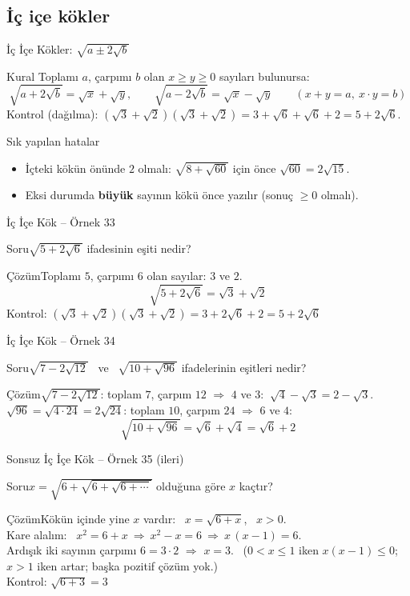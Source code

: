 \documentclass[aspectratio=169,11pt,handout]{beamer}
\newcommand{\soru}[3]{%
\begin{frame}{#1}
  \begin{block}{Soru}\large #2\end{block}
  \pause
  \begin{exampleblock}{Çözüm}\large #3\end{exampleblock}
\end{frame}}
\begin{document}
\subsection{İç içe kökler}
\begin{frame}{İç İçe Kökler: \(\sqrt{a\pm 2\sqrt b}\)}
\begin{block}{Kural}
Toplamı \(a\), çarpımı \(b\) olan \(x\ge y\ge 0\) sayıları bulunursa:
\[\sqrt{a+2\sqrt b}=\sqrt x+\sqrt y,\qquad \sqrt{a-2\sqrt b}=\sqrt x-\sqrt y\qquad(x+y=a,\ x\cdot y=b)\]
Kontrol (dağılma): \((\sqrt3+\sqrt2)(\sqrt3+\sqrt2)=3+\sqrt6+\sqrt6+2=5+2\sqrt6\).
\end{block}
\begin{alertblock}{Sık yapılan hatalar}
\begin{itemize}
\item İçteki kökün önünde \textbf{\(2\)} olmalı: \(\sqrt{8+\sqrt{60}}\) için önce \(\sqrt{60}=2\sqrt{15}\).
\item Eksi durumda \textbf{büyük} sayının kökü önce yazılır (sonuç \(\ge 0\) olmalı).
\end{itemize}
\end{alertblock}
\end{frame}

\soru{İç İçe Kök -- Örnek 33}
{\(\sqrt{5+2\sqrt6}\) ifadesinin eşiti nedir?}
{Toplamı \(5\), çarpımı \(6\) olan sayılar: \(3\) ve \(2\).
\[\sqrt{5+2\sqrt6}=\sqrt3+\sqrt2\]
Kontrol: \((\sqrt3+\sqrt2)(\sqrt3+\sqrt2)=3+2\sqrt6+2=5+2\sqrt6\) \checkmark}

\soru{İç İçe Kök -- Örnek 34}
{\(\sqrt{7-2\sqrt{12}}\) \ ve \ \(\sqrt{10+\sqrt{96}}\) ifadelerinin eşitleri nedir?}
{\(\sqrt{7-2\sqrt{12}}\): toplam \(7\), çarpım \(12\) \(\Rightarrow\) \(4\) ve \(3\):
\(\ \sqrt4-\sqrt3=2-\sqrt3\).\\[4pt]
\(\sqrt{96}=\sqrt{4\cdot 24}=2\sqrt{24}\): toplam \(10\), çarpım \(24\) \(\Rightarrow\) \(6\) ve \(4\):
\[\sqrt{10+\sqrt{96}}=\sqrt6+\sqrt4=\sqrt6+2\]}

\soru{Sonsuz İç İçe Kök -- Örnek 35 (ileri)}
{\(x=\sqrt{6+\sqrt{6+\sqrt{6+\cdots}}}\) olduğuna göre \(x\) kaçtır?}
{Kökün içinde yine \(x\) vardır: \ \(x=\sqrt{6+x}\), \ \(x>0\).\\[3pt]
Kare alalım: \ \(x^2=6+x\ \Rightarrow\ x^2-x=6\ \Rightarrow\ x\,(x-1)=6\).\\[3pt]
Ardışık iki sayının çarpımı \(6=3\cdot 2\) \(\Rightarrow\) \(x=3\). \ (\(0<x\le 1\) iken \(x(x-1)\le 0\); \(x>1\) iken artar; başka pozitif çözüm yok.)\\[3pt]
Kontrol: \(\sqrt{6+3}=3\) \checkmark}
\end{document}
